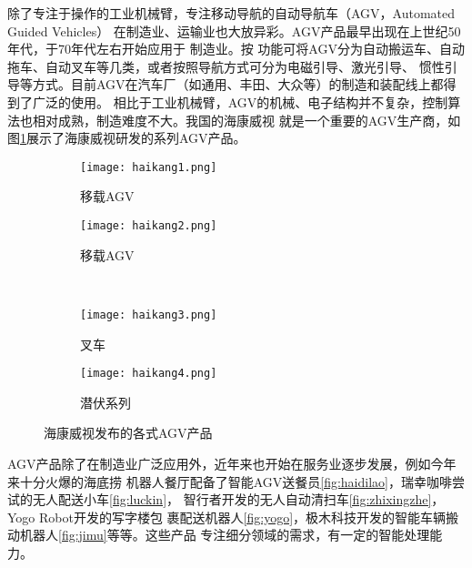 除了专注于操作的工业机械臂，专注移动导航的自动导航车（AGV，Automated Guided Vehicles）
在制造业、运输业也大放异彩。AGV产品最早出现在上世纪50年代，于70年代左右开始应用于
制造业\cite{黄志球2010自动导航车}。按
功能可将AGV分为自动搬运车、自动拖车、自动叉车等几类，或者按照导航方式可分为电磁引导、激光引导、
惯性引导等方式。目前AGV在汽车厂（如通用、丰田、大众等）的制造和装配线上都得到了广泛的使用。
相比于工业机械臂，AGV的机械、电子结构并不复杂，控制算法也相对成熟，制造难度不大。我国的海康威视
就是一个重要的AGV生产商，如图\ref{fig:haikang}展示了海康威视研发的系列AGV产品。

\begin{figure}
\centering
\begin{subfigure}{.5\textwidth}
  \centering
  \texttt{[image: haikang1.png]}
  \caption{移载AGV}
\end{subfigure}%
\begin{subfigure}{.5\textwidth}
  \centering
  \texttt{[image: haikang2.png]}
  \caption{移载AGV}
\end{subfigure}%
\\
\begin{subfigure}{.5\textwidth}
  \centering
  \texttt{[image: haikang3.png]}
  \caption{叉车}
\end{subfigure}%
\begin{subfigure}{.5\textwidth}
  \centering
  \texttt{[image: haikang4.png]}
  \caption{潜伏系列}
\end{subfigure}%
\caption{海康威视发布的各式AGV产品}
\label{fig:haikang}
\end{figure}

AGV产品除了在制造业广泛应用外，近年来也开始在服务业逐步发展，例如今年来十分火爆的海底捞
机器人餐厅配备了智能AGV送餐员\ref{fig:haidilao}，瑞幸咖啡尝试的无人配送小车\ref{fig:luckin}，
智行者开发的无人自动清扫车\ref{fig:zhixingzhe}， Yogo Robot开发的写字楼包
裹配送机器人\ref{fig:yogo}，极木科技开发的智能车辆搬动机器人\ref{fig:jimu}等等。这些产品
专注细分领域的需求，有一定的智能处理能力。

